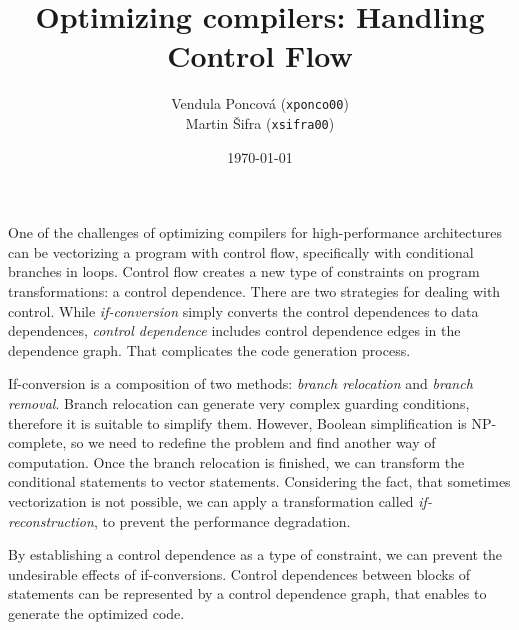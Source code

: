 \documentclass[a4paper, 12pt]{article}
\title{Optimizing compilers: Handling Control Flow}
\author{Vendula Poncová (\texttt{xponco00}) \\ Martin Šifra (\texttt{xsifra00})}
\date{\today}
\begin{document}
\maketitle

One of the challenges of optimizing compilers for high-performance architectures can be vectorizing a program with control flow, specifically with conditional branches in loops. Control flow creates a new type of constraints on program transformations: a control dependence. There are two strategies for dealing with control. While \textit{if-conversion} simply converts the control dependences to data dependences, \textit{control dependence} includes control dependence edges in the dependence graph. That complicates the code generation process. 

If-conversion is a composition of two methods: \textit{branch relocation} and \textit{branch removal}. Branch relocation can generate very complex guarding conditions, therefore it is suitable to simplify them. However, Boolean simplification is NP-complete, so we need to redefine the problem and find another way of computation. Once the branch relocation is finished, we can transform the conditional statements to vector statements. Considering the fact, that sometimes vectorization is not possible, we can apply a transformation called \textit{if-reconstruction}, to prevent the performance degradation.

By establishing a control dependence as a type of constraint, we can prevent the undesirable effects of if-conversions. Control dependences between blocks of statements can be represented by a control dependence graph, that enables to generate the optimized code.
\end{document}
